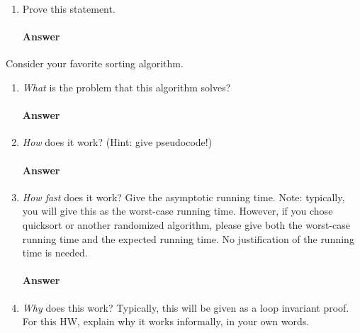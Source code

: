 \documentclass{article}
\begin{document}
{\begin{enumerate}
        \paragraph{Answer}
        \todo{}

    \item Prove this statement.

        \paragraph{Answer}
        \todo{}

\end{enumerate}



\collab{\todo{}}
Consider your favorite sorting algorithm.
\begin{enumerate}
    \item \emph{What} is the problem that this algorithm solves?

        \paragraph{Answer}
        \todo{}

    \item \emph{How} does it work? (Hint: give pseudocode!)

        \paragraph{Answer}
        \todo{}

    \item \emph{How fast} does it work?  Give the asymptotic running time.
        Note: typically, you will give this as the worst-case running time.
        However, if you chose quicksort or another randomized algorithm, please
        give both the worst-case running time and the expected running time.  No
        justification of the running time is needed.

        \paragraph{Answer}
        \todo{}

    \item \emph{Why} does this work? Typically, this will be given as a loop
        invariant proof.  For this HW, explain why it works informally, in your
        own words.


\end{enumerate}}
\end{document}
